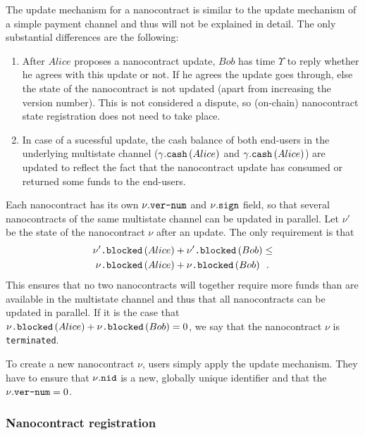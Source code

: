     The update mechanism for a nanocontract is similar to the update mechanism of a simple
    payment channel and thus will not be explained in detail. The only substantial
    differences are the following:
    \begin{enumerate}
      \item After $Alice$ proposes a nanocontract update, $Bob$ has time $\Upsilon$ to
      reply whether he agrees with this update or not. If he agrees the update goes
      through, else the state of the nanocontract is not updated (apart from increasing
      the version number). This is not considered a dispute, so (on-chain) nanocontract
      state registration does not need to take place.
      \item In case of a sucessful update, the cash balance of both end-users in the
      underlying multistate channel ($\gamma\mbox{.\texttt{cash}}\left(Alice\right)$ and
      $\gamma\mbox{.\texttt{cash}}\left(Alice\right)$) are updated to reflect the fact
      that the nanocontract update has consumed or returned some funds to the end-users.
    \end{enumerate}

    Each nanocontract has its own $\nu\mbox{.\texttt{ver-num}}$ and
    $\nu\mbox{.\texttt{sign}}$ field, so that several nanocontracts of the same multistate
    channel can be updated in parallel. Let $\nu'$ be the state of the nanocontract $\nu$
    after an update. The only requirement is that
    \begin{align*}
      \nu'\mbox{\texttt{.blocked}}\left(Alice\right) &+
      \nu'\mbox{\texttt{.blocked}}\left(Bob\right) \leq \\
      \nu\mbox{\texttt{.blocked}}\left(Alice\right) &+
      \nu\mbox{\texttt{.blocked}}\left(Bob\right) \enspace.
    \end{align*}
    This ensures that no two nanocontracts will together require more funds than are
    available in the multistate channel and thus that all nanocontracts can be updated in
    parallel. If it is the case that $\nu\mbox{\texttt{.blocked}}\left(Alice\right) +
    \nu\mbox{\texttt{.blocked}}\left(Bob\right) = 0$, we say that the nanocontract $\nu$
    is \texttt{terminated}.

    To create a new nanocontract $\nu$, users simply apply the update mechanism. They have
    to ensure that $\nu\mbox{.\texttt{nid}}$ is a new, globally unique identifier and that
    the $\nu\mbox{.\texttt{ver-num}} = 0$.

  \subsubsection{Nanocontract registration} \ \\

